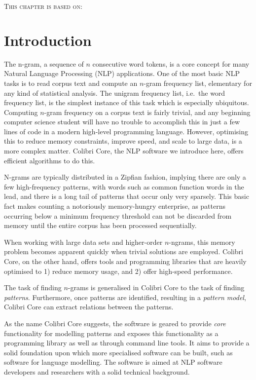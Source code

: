 \nobibliography*
\textsc{This chapter is based on: }
\begin{NoHyper}\end{NoHyper}

\section{Introduction}

The n-gram, a sequence of $n$ consecutive word tokens, is a core concept for
many Natural Language Processing (NLP) applications. One of the most basic NLP
tasks is to read corpus text and compute an $n$-gram frequency list, elementary
for any kind of statistical analysis. The unigram frequency list, i.e.\ the
word frequency list, is the simplest instance of this task which is especially
ubiquitous. Computing $n$-gram frequency on a corpus text is fairly trivial,
and any beginning computer science student will have no trouble to accomplish
this in just a few lines of code in a modern high-level programming language.
However, optimising this to reduce memory constraints, improve speed, and scale
to large data, is a more complex matter. Colibri Core, the NLP software we
introduce here, offers efficient algorithms to do this.

N-grams are typically distributed in a Zipfian fashion, implying there are only
a few high-frequency patterns, with words such as common function words in the
lead, and there is a long tail of patterns that occur only very sparsely. This
basic fact makes counting a notoriously memory-hungry enterprise, as patterns
occurring below a minimum frequency threshold can not be discarded from
memory until the entire corpus has been processed sequentially.

When working with large data sets and higher-order $n$-ngrams, this memory
problem becomes apparent quickly when trivial solutions are employed. Colibri
Core, on the other hand, offers tools and programming libraries that are
heavily optimised to 1) reduce memory usage, and 2) offer high-speed performance.

The task of finding $n$-grams is generalised in Colibri Core to the task of
finding \emph{patterns}. Furthermore, once patterns are identified, resulting in a
\emph{pattern model}, Colibri Core can extract relations between the patterns.

As the name Colibri Core suggests, the software is geared to provide
\emph{core} functionality for modelling patterns and exposes this functionality
as a programming library as well as through command line tools. It aims to
provide a solid foundation upon which more specialised software can be built,
such as software for language modelling. The software is aimed at
NLP software developers and researchers with a solid technical background.

